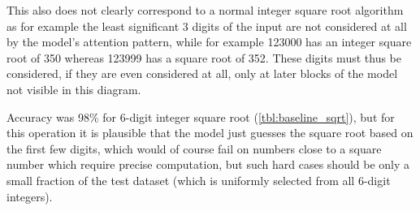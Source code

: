 This also does not clearly correspond to a normal integer square root algorithm as for example the least significant 3 digits of the input are not considered at all by the model's attention pattern, while for example 123000 has an integer square root of 350 whereas 123999 has a square root of 352. These digits must thus be considered, if they are even considered at all, only at later blocks of the model not visible in this diagram.

Accuracy was 98\% for 6-digit integer square root (\cref{tbl:baseline_sqrt}), but for this operation it is plausible that the model just guesses the square root based on the first few digits, which would of course fail on numbers close to a square number which require precise computation, but such hard cases should be only a small fraction of the test dataset (which is uniformly selected from all 6-digit integers).
